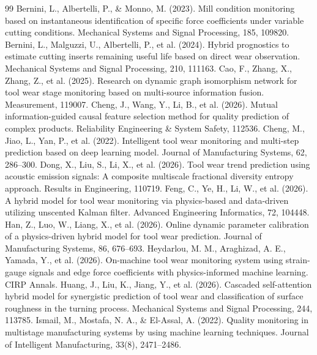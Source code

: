 \documentclass[a4paper,fleqn]{cas-sc}
\begin{document}
  \begin{thebibliography}{99}
     Bernini, L., Albertelli, P., \& Monno, M. (2023). Mill condition monitoring based on instantaneous identification of specific force coefficients under variable cutting conditions. Mechanical Systems and Signal Processing, 185, 109820.
     Bernini, L., Malguzzi, U., Albertelli, P., et al. (2024). Hybrid prognostics to estimate cutting inserts remaining useful life based on direct wear observation. Mechanical Systems and Signal Processing, 210, 111163.
     Cao, F., Zhang, X., Zhang, Z., et al. (2025). Research on dynamic graph isomorphism network for tool wear stage monitoring based on multi-source information fusion. Measurement, 119007.
     Cheng, J., Wang, Y., Li, B., et al. (2026). Mutual information-guided causal feature selection method for quality prediction of complex products. Reliability Engineering \& System Safety, 112536.
     Cheng, M., Jiao, L., Yan, P., et al. (2022). Intelligent tool wear monitoring and multi-step prediction based on deep learning model. Journal of Manufacturing Systems, 62, 286--300.
     Dong, X., Liu, S., Li, X., et al. (2026). Tool wear trend prediction using acoustic emission signals: A composite multiscale fractional diversity entropy approach. Results in Engineering, 110719.
     Feng, C., Ye, H., Li, W., et al. (2026). A hybrid model for tool wear monitoring via physics-based and data-driven utilizing unscented Kalman filter. Advanced Engineering Informatics, 72, 104448.
     Han, Z., Luo, W., Liang, X., et al. (2026). Online dynamic parameter calibration of a physics-driven hybrid model for tool wear prediction. Journal of Manufacturing Systems, 86, 676--693.
     Heydarlou, M. M., Araghizad, A. E., Yamada, Y., et al. (2026). On-machine tool wear monitoring system using strain-gauge signals and edge force coefficients with physics-informed machine learning. CIRP Annals.
     Huang, J., Liu, K., Jiang, Y., et al. (2026). Cascaded self-attention hybrid model for synergistic prediction of tool wear and classification of surface roughness in the turning process. Mechanical Systems and Signal Processing, 244, 113785.
     Ismail, M., Mostafa, N. A., \& El-Assal, A. (2022). Quality monitoring in multistage manufacturing systems by using machine learning techniques. Journal of Intelligent Manufacturing, 33(8), 2471--2486.

\end{thebibliography}
\end{document}
